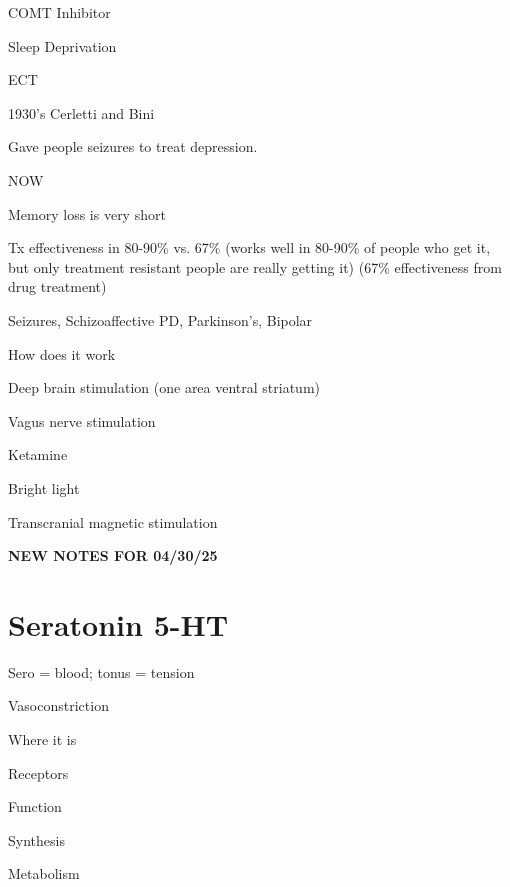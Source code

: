 \begin{coloredlist}
    \item COMT Inhibitor
    \item Sleep Deprivation
    \item ECT
    \begin{coloredlist}
        \item 1930's Cerletti and Bini
        \begin{coloredlist}
            \item Gave people seizures to treat depression.
        \end{coloredlist}
        \item NOW
        \begin{coloredlist}
            \item Memory loss is very short
            \item Tx effectiveness in 80-90\% vs. 67\% (works well in 80-90\% of people who get it, but only treatment resistant people are really getting it) (67\% effectiveness from drug treatment)
            \item Seizures, Schizoaffective PD, Parkinson's, Bipolar
            \item How does it work
            \begin{coloredlist}
                \item 
            \end{coloredlist}
        \end{coloredlist}
    \end{coloredlist}
    \item Deep brain stimulation (one area ventral striatum)
    \item Vagus nerve stimulation
    \item Ketamine
    \item Bright light
    \item Transcranial magnetic stimulation
\end{coloredlist}

\begin{center}
    \textbf{NEW NOTES FOR 04/30/25} \\
    \hrulefill
\end{center}

\section{Seratonin 5-HT}

\begin{coloredlist}
    \item Sero = blood; tonus = tension
    \begin{coloredlist}
        \item Vasoconstriction
    \end{coloredlist}
    \item Where it is
    \item Receptors
    \item Function
    \item Synthesis
    \item Metabolism
\end{coloredlist}


